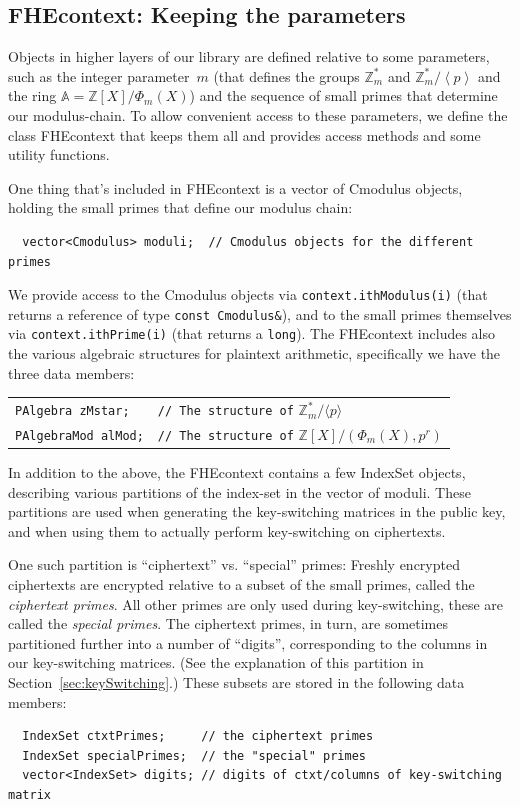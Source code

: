 \documentclass[14pt]{extarticle}
\newcommand{\secref}[1]{Section~\protect\ref{sec:#1}}
\newcommand{\A}{\mathbb{A}}
\newcommand{\Z}{\mathbb{Z}}
\newcommand{\grp}[1]{\left\langle #1 \right\rangle}
\def\Cmodulus{\textsf{Cmodulus}}
\def\IndexSet{\textsf{IndexSet}}
\def\FHEcontext{\textsf{FHEcontext}}
\begin{document}
\subsection{{\FHEcontext}: Keeping the parameters}\label{sec:FHEcontext}
Objects in higher layers of our library are defined
relative to some parameters, such as the integer parameter~$m$ (that
defines the groups $\Z_m^*$ and $\Z_m^*/\grp{p}$ and the ring $\A=
\Z[X]/\Phi_m(X)$) and the sequence of small primes that determine our
modulus-chain. To allow convenient access to these parameters, we
define the class {\FHEcontext} that keeps them all and provides
access methods and some utility functions.

One thing that's included in {\FHEcontext} is a vector of {\Cmodulus}
objects, holding the small primes that define our modulus chain:
\begin{verbatim}
  vector<Cmodulus> moduli;  // Cmodulus objects for the different primes
\end{verbatim}

We provide access to the {\Cmodulus} objects via
\texttt{context.ithModulus(i)} (that returns a reference of type
\texttt{const Cmodulus\&}), and to the small primes themselves via
\texttt{context.ithPrime(i)} (that returns a \texttt{long}).
The {\FHEcontext} includes also the various algebraic structures for
plaintext arithmetic, specifically we have the three data members:

\smallskip\begin{tabular}{ll}
\texttt{PAlgebra zMstar;}
   & \texttt{// The structure of} $\Z_m^*/\langle p \rangle$ \\
\texttt{PAlgebraMod alMod;}
   & \texttt{// The structure of} $\Z[X]/(\Phi_m(X),p^r)$
\end{tabular}

\medskip
In addition to the above, the {\FHEcontext} contains a few
{\IndexSet} objects, describing various partitions of the index-set in
the vector of moduli. These partitions are used when generating the
key-switching matrices in the public key, and when using them to
actually perform key-switching on ciphertexts.

One such partition is ``ciphertext'' vs. ``special'' primes:
Freshly encrypted ciphertexts are encrypted relative to a subset of
the small primes, called the \emph{ciphertext primes}. All other
primes are only used during key-switching, these are called the
\emph{special primes}. The ciphertext primes, in turn, are sometimes
partitioned further into a number of ``digits'', corresponding to the
columns in our key-switching matrices. (See the explanation of this
partition in \secref{keySwitching}.) These subsets are stored
in the following data members:
\begin{verbatim}
  IndexSet ctxtPrimes;     // the ciphertext primes
  IndexSet specialPrimes;  // the "special" primes
  vector<IndexSet> digits; // digits of ctxt/columns of key-switching matrix
\end{verbatim}
\end{document}
